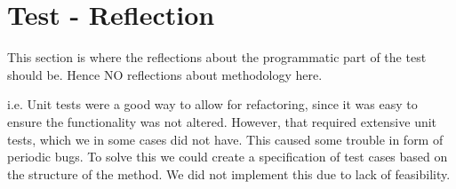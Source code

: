 \section{Test - Reflection}
This section is where the reflections about the programmatic part of the test should be. Hence NO reflections about methodology here.

i.e. Unit tests were a good way to allow for refactoring, since it was easy to ensure the functionality was not altered. However, that required extensive unit tests, which we in some cases did not have. This caused some trouble in form of periodic bugs. To solve this we could create a specification of test cases based on the structure of the method. We did not implement this due to lack of feasibility.